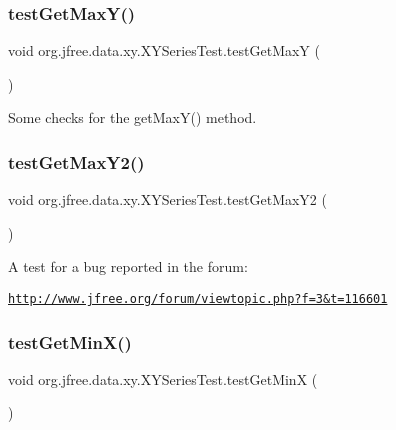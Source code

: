 \subsubsection{\texorpdfstring{test\+Get\+Max\+Y()}{testGetMaxY()}}
{\footnotesize\ttfamily void org.\+jfree.\+data.\+xy.\+X\+Y\+Series\+Test.\+test\+Get\+MaxY (\begin{DoxyParamCaption}{ }\end{DoxyParamCaption})}

Some checks for the get\+Max\+Y() method. \mbox{\label{classorg_1_1jfree_1_1data_1_1xy_1_1_x_y_series_test_a2c0b19d6e19c1a7dd8697f0cdf1665b6}} 
\subsubsection{\texorpdfstring{test\+Get\+Max\+Y2()}{testGetMaxY2()}}
{\footnotesize\ttfamily void org.\+jfree.\+data.\+xy.\+X\+Y\+Series\+Test.\+test\+Get\+Max\+Y2 (\begin{DoxyParamCaption}{ }\end{DoxyParamCaption})}

A test for a bug reported in the forum\+:

\href{http://www.jfree.org/forum/viewtopic.php?f=3&t=116601}{\tt http\+://www.\+jfree.\+org/forum/viewtopic.\+php?f=3\&t=116601} \mbox{\label{classorg_1_1jfree_1_1data_1_1xy_1_1_x_y_series_test_a8f76b40826c07da92c75cd927cec4797}} 
\subsubsection{\texorpdfstring{test\+Get\+Min\+X()}{testGetMinX()}}
{\footnotesize\ttfamily void org.\+jfree.\+data.\+xy.\+X\+Y\+Series\+Test.\+test\+Get\+MinX (\begin{DoxyParamCaption}{ }\end{DoxyParamCaption})}

